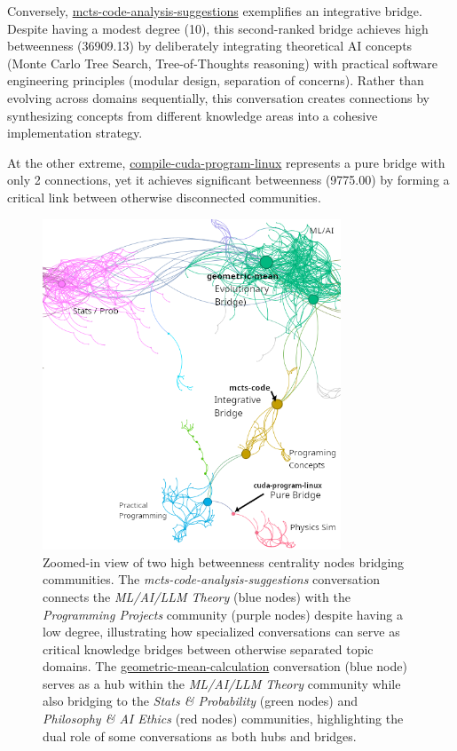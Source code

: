 \documentclass[10pt, a4paper]{article}
\begin{document}
Conversely, \url{mcts-code-analysis-suggestions} exemplifies an integrative bridge. Despite having a modest degree (10), this second-ranked bridge achieves high betweenness (36909.13) by deliberately integrating theoretical AI concepts (Monte Carlo Tree Search, Tree-of-Thoughts reasoning) with practical software engineering principles (modular design, separation of concerns). Rather than evolving across domains sequentially, this conversation creates connections by synthesizing concepts from different knowledge areas into a cohesive implementation strategy.

At the other extreme, \url{compile-cuda-program-linux} represents a pure bridge with only 2 connections, yet it achieves significant betweenness (9775.00) by forming a critical link between otherwise disconnected communities.

\begin{figure}
\centering
\includegraphics[width=3.5in]{./images/bridge-better.png}
\caption{Zoomed-in view of two high betweenness centrality nodes bridging communities. The \emph{mcts-code-analysis-suggestions} conversation connects the \emph{ML/AI/LLM Theory} (blue nodes) with the \emph{Programming Projects} community (purple nodes) despite having a low degree, illustrating how specialized conversations can serve as critical knowledge bridges between otherwise separated topic domains. The \url{geometric-mean-calculation} conversation (blue node) serves as a hub within the \emph{ML/AI/LLM Theory} community while also bridging to the \emph{Stats \& Probability} (green nodes) and \emph{Philosophy \& AI Ethics} (red nodes) communities, highlighting the dual role of some conversations as both hubs and bridges.}
\label{fig:bridge_zoom}
\end{figure}
\end{document}
